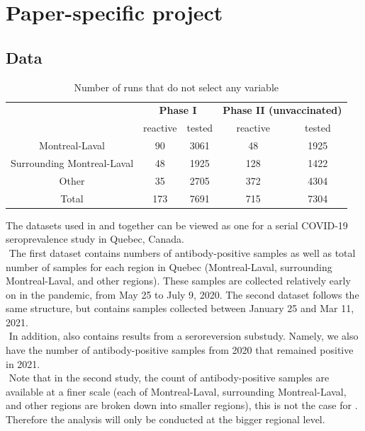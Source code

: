 \section{Paper-specific project}

\subsection{Data}

\begin{table}[]
\centering
\caption{Number of runs that do not select any variable}
\label{tab:num_none}
\begin{tabular}{c|cc|cc}
                           & \multicolumn{2}{c}{\textbf{Phase I}} & \multicolumn{2}{c}{\textbf{Phase II (unvaccinated)}} \\
                           & reactive      & tested      & reactive              & tested              \\
                           \hline
Montreal-Laval             & 90            & 3061        & 48                    & 1925                \\
Surrounding Montreal-Laval & 48            & 1925        & 128                   & 1422                \\
Other                      & 35            & 2705        & 372                   & 4304                \\
\hline
Total                      & 173           & 7691        & 715                   & 7304               
\end{tabular}
\end{table}

The datasets used in \cite{lewin2021sars} and \cite{lewin2022seroprevalence} together can be viewed as one for a serial COVID-19 seroprevalence study in Quebec, Canada. \\
\newline $ $
The first dataset contains numbers of antibody-positive samples as well as total number of samples for each region in Quebec (Montreal-Laval, surrounding Montreal-Laval, and other regions). These samples are collected relatively early on in the pandemic, from May 25 to July 9, 2020. The second dataset follows the same structure, but contains samples collected between January 25 and Mar 11, 2021. \\
\newline $ $
In addition, \cite{lewin2022seroprevalence} also contains results from a seroreversion substudy. Namely, we also have the number of antibody-positive samples from 2020 that remained positive in 2021. \\
\newline $ $
Note that in the second study, the count of antibody-positive samples are available at a finer scale (each of Montreal-Laval, surrounding Montreal-Laval, and other regions are broken down into smaller regions), this is not the case for \cite{lewin2021sars}. Therefore the analysis will only be conducted at the bigger regional level.

